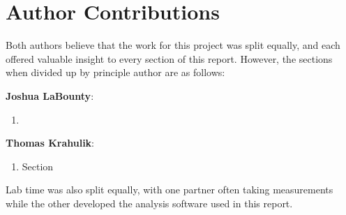 \documentclass[%
 reprint,
 amsmath,amssymb,
 aps,
 pra,
]{revtex4-1}
\begin{document}
\section{Author Contributions}

Both authors believe that the work for this project was split equally, and each offered valuable insight to every section of this report. However, the sections when divided up by principle author are as follows:

\noindent \textbf{Joshua LaBounty}:
\begin{enumerate}
	\item 
\end{enumerate}

\noindent \textbf{Thomas Krahulik}:
\begin{enumerate}
	\item Section 
\end{enumerate}

\noindent Lab time was also split equally, with one partner often taking measurements while the other developed the analysis software used in this report.
\end{document}
